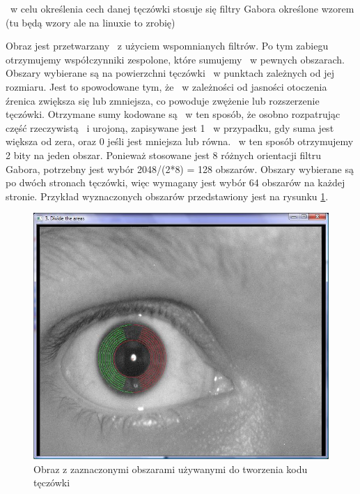\begin{itemize}
~w celu określenia cech danej tęczówki stosuje się filtry Gabora określone wzorem (tu będą wzory ale na linuxie to zrobię)

Obraz jest przetwarzany ~z użyciem wspomnianych filtrów. Po tym zabiegu otrzymujemy współczynniki zespolone, które sumujemy ~w pewnych obszarach. Obszary wybierane są na powierzchni tęczówki ~w punktach zależnych od jej rozmiaru. Jest to spowodowane tym, że ~w zależności od jasności otoczenia źrenica zwiększa się lub zmniejsza, co powoduje zwężenie lub rozszerzenie tęczówki. Otrzymane sumy kodowane są ~w ten sposób, że osobno rozpatrując część rzeczywistą ~i urojoną, zapisywane jest 1 ~w przypadku, gdy suma jest większa od zera, oraz 0 jeśli jest mniejsza lub równa. ~w ten sposób otrzymujemy 2 bity na jeden obszar. Ponieważ stosowane jest 8 różnych orientacji filtru Gabora, potrzebny jest wybór 2048/(2*8) = 128 obszarów. Obszary wybierane są po dwóch stronach tęczówki, więc wymagany jest wybór 64 obszarów na każdej stronie. Przykład wyznaczonych obszarów przedstawiony jest na rysunku \ref{fig:obszaryNasze}.

\begin{figure}
\begin{center}
\includegraphics[scale=0.5]{obszary.jpg}
\caption{Obraz z zaznaczonymi obszarami używanymi do tworzenia kodu tęczówki}
\label{fig:obszaryNasze}
\end{center}
\end{figure}


\end{itemize}
